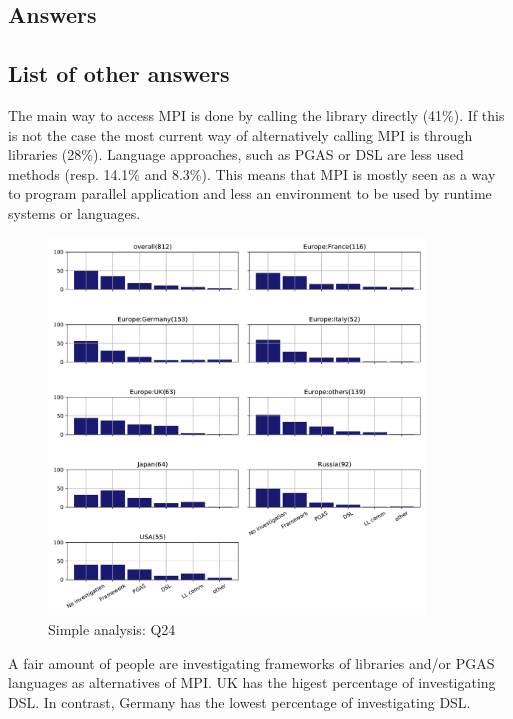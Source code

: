 
\subsection{Answers}



\subsection{List of other answers}
\begin{itemize}

\end{itemize}

The main way to access MPI is done by calling the library directly (41\%). If this is
not the case the most current way  of alternatively calling MPI is through
libraries (28\%). Language approaches, such as PGAS or DSL are less used methods
(resp. 14.1\% and 8.3\%).  This means that MPI is mostly seen as a way to program
parallel application and less an environment to be used by runtime systems or
languages.  

\begin{figure}[htb]
\begin{center}
\includegraphics[width=10cm]{../pdfs/Q24.pdf}
\caption{Simple analysis: Q24}
\label{fig:Q24}
\end{center}
\end{figure}

A fair amount of people are investigating frameworks of libraries
and/or PGAS languages as alternatives of MPI.  UK has the higest
percentage of investigating DSL. In contrast, Germany has the lowest
percentage of investigating DSL. 
